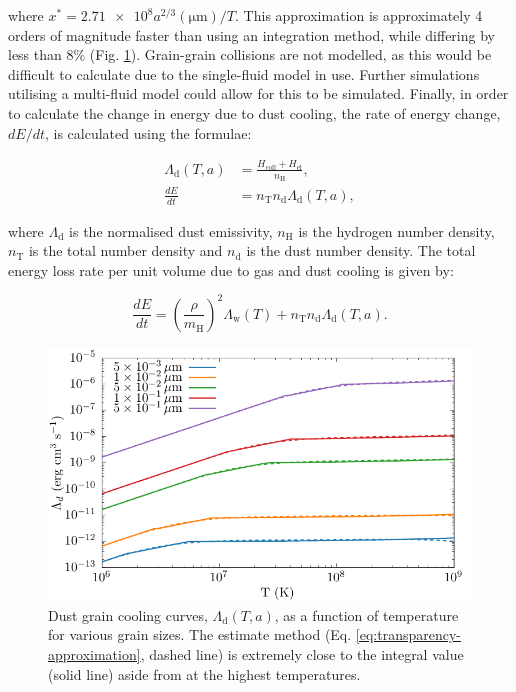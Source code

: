 \documentclass[fleqn,usenatbib]{mnras}
\begin{document}
\noindent
where $x^* = \num{2.71e8} a^{2/3} (\si{\micro\metre})/T$.
This approximation is approximately 4 orders of magnitude faster than using an integration method, while differing by less than 8\% (Fig. \ref{fig:lambdacomparison}).
Grain-grain collisions are not modelled, as this would be difficult to calculate due to the single-fluid model in use.
Further simulations utilising a multi-fluid model could allow for this to be simulated.
Finally, in order to calculate the change in energy due to dust cooling, the rate of energy change, $dE/dt$, is calculated using the formulae:

\begin{subequations}
  \label{eq:transparency-approximation}
  \begin{align}
    \Lambda_\text{d}(T,a) & = \frac{H_\text{coll} + H_\text{el}}{n_\text{H}} , \\
    \frac{dE}{dt}         & = n_\text{T} n_\text{d} \Lambda_\text{d} (T,a) ,
  \end{align}
\end{subequations}

\noindent
where $\Lambda_\text{d}$ is the normalised dust emissivity,
$n_\text{H}$ is the hydrogen number density,
$n_\text{T}$ is the total number density
and $n_\text{d}$ is the dust number density.
The total energy loss rate per unit volume due to gas and dust cooling is given by:

\begin{equation}
	\frac{dE}{dt} = \left( \frac{\rho}{m_\text{H}} \right)^2 \Lambda_\text{w}(T) + n_\text{T} n_\text{d} \Lambda_\text{d} (T,a) .
\end{equation}

\begin{figure}
  \centering
  \includegraphics[width=\linewidth]{assets/grain-transparency/lambda-comp.pdf}
  \caption[Comparison of electron transparency methods.]{Dust grain cooling curves, $\Lambda_\text{d}(T,a)$, as a function of temperature for various grain sizes. The estimate method (Eq. \ref{eq:transparency-approximation}, dashed line) is extremely close to the integral value (solid line) aside from at the highest temperatures.}
  \label{fig:lambdacomparison}
\end{figure}
\end{document}
